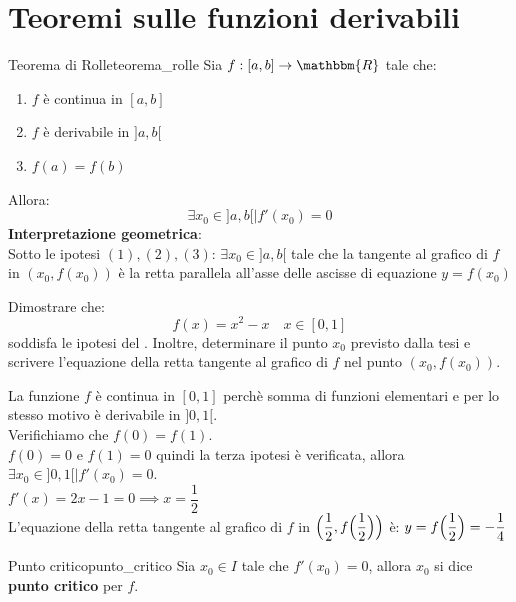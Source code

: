 \documentclass[12pt]{report}
\newcounter{theorem}
\newcounter{definition}
\newcounter{exercise}
\newcommand{\namerefl}[1]{%
	\bgroup
	\let\nmu\MakeLowercase
	\nameref{#1}\egroup}
\newcommand{\nmu}{}
\begin{document}
 	\section{Teoremi sulle funzioni derivabili}
 	\begin{theorem}{\nmu Teorema di Rolle}{teorema_rolle}
 		Sia $f: [a, b] \to \mathbbm{R}$ tale che:
 		\begin{enumerate}[label=(\arabic*)]
 			\item $f$ è continua in $[a,b]$
 			\item $f$ è derivabile in $]a,b[$
 			\item $f(a) = f(b)$
 		\end{enumerate}
 		Allora:
 		\[
 		\exists x_0 \in ]a, b[ \mid f'(x_0) = 0
 		\]
 		\textbf{Interpretazione geometrica}: \\
 		Sotto le ipotesi $(1), (2), (3)$: $\exists x_0 \in ]a,b[$ tale che la tangente al grafico di $f$ in $(x_0, f(x_0))$ è la retta parallela all'asse delle ascisse di equazione $y = f(x_0)$
 	\end{theorem}
 	\begin{assignment}{}{}
 		Dimostrare che:
 		\[
 		f(x) = x^2 - x \quad x \in [0,1]
 		\]
 		soddisfa le ipotesi del \namerefl{th:teorema_rolle}. Inoltre, determinare il punto $x_0$ previsto dalla tesi e scrivere l'equazione della retta tangente al grafico di $f$ nel punto $(x_0, f(x_0))$. \\
 		\begin{exercise}{}{}
 			La funzione $f$ è continua in $[0,1]$ perchè somma di funzioni elementari e per lo stesso motivo è derivabile in $]0, 1[$. \\
 			Verifichiamo che $f(0) = f(1)$. \\
 			$f(0) = 0$ e $f(1) = 0$ quindi la terza ipotesi è verificata, allora $\exists x_0 \in ]0, 1[ \mid f'(x_0) = 0$. \\
 			$f'(x) = 2x - 1 = 0 \implies x=\dfrac{1}{2}$ \\
 			L'equazione della retta tangente al grafico di $f$ in  $\Bigl(\dfrac{1}{2}, f\Bigl(\dfrac{1}{2}\Bigr)\Bigr)$ è: $y = f\Bigl(\dfrac{1}{2}\Bigr)=-\dfrac{1}{4}$
 		\end{exercise}
 	\end{assignment}
 	\begin{definition}{\nmu Punto critico}{punto_critico}
 		Sia $x_0 \in I$ tale che $f'(x_0) = 0$, allora $x_0$ si dice \textbf{punto critico} per $f$.
 	\end{definition}
\end{document}
